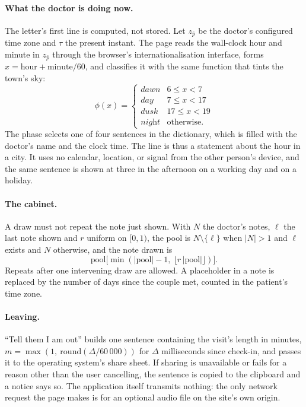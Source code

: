 \documentclass[sigconf,nonacm]{acmart}
\begin{document}
\paragraph{What the doctor is doing now.}
The letter's first line is computed, not stored. Let $z_{\bar p}$ be the doctor's configured
time zone and $\tau$ the present instant. The page reads the wall-clock hour and minute in
$z_{\bar p}$ through the browser's internationalisation interface, forms
$x = \mathrm{hour} + \mathrm{minute}/60$, and classifies it with the same function that tints
the town's sky:
\begin{equation}\label{eq:clinicphase}
  \phi(x) = \begin{cases}
    \textit{dawn} & 6 \le x < 7 \\
    \textit{day} & 7 \le x < 17 \\
    \textit{dusk} & 17 \le x < 19 \\
    \textit{night} & \text{otherwise.}
  \end{cases}
\end{equation}
The phase selects one of four sentences in the dictionary, which is filled with the doctor's
name and the clock time. The line is thus a statement about the hour in a city. It uses no
calendar, location, or signal from the other person's device, and the same sentence is shown at
three in the afternoon on a working day and on a holiday.

\paragraph{The cabinet.}
A draw must not repeat the note just shown. With $N$ the doctor's notes, $\ell$ the last note
shown and $r$ uniform on $[0,1)$, the pool is $N\setminus\{\ell\}$ when $|N|>1$ and $\ell$
exists and $N$ otherwise, and the note drawn is
\begin{equation}\label{eq:draw}
  \mathrm{pool}\big[\min(|\mathrm{pool}|-1,\ \lfloor r\,|\mathrm{pool}| \rfloor)\big].
\end{equation}
Repeats after one intervening draw are allowed. A placeholder in a note is replaced by the
number of days since the couple met, counted in the patient's time zone.

\paragraph{Leaving.}
``Tell them I am out'' builds one sentence containing the visit's length in minutes,
$m=\max(1,\ \mathrm{round}(\Delta/60\,000))$ for $\Delta$ milliseconds since check-in, and
passes it to the operating system's share sheet. If sharing is unavailable or fails for a
reason other than the user cancelling, the sentence is copied to the clipboard and a notice
says so. The application itself transmits nothing: the only network request the page makes is
for an optional audio file on the site's own origin.
\end{document}
